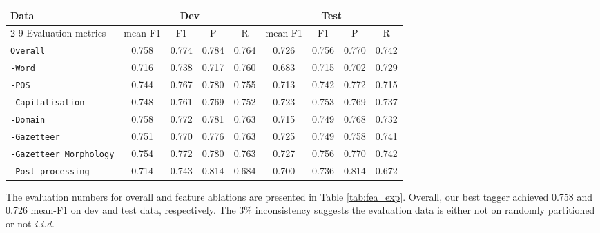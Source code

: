 \documentclass[11pt]{article}
\newcommand{\feature}[1]{\texttt{#1}\xspace}
\newcommand{\tabref}[2][]{Table#1 \ref{#2}}
\begin{document}
\begin{table*}[!htbp]
\begin{center}
\begin{tabular}{lcccccccc}
\toprule
Data                                         & \multicolumn{4}{c}{Dev}             & \multicolumn{4}{c}{Test}        \\
\cmidrule{2-9}
Evaluation metrics                           & mean-F1 & F1    & P     & R         & mean-F1 & F1    & P     & R     \\ 
\midrule
\feature{Overall}                            & 0.758   & 0.774 & 0.784 & 0.764     & 0.726   & 0.756 & 0.770 & 0.742 \\
\feature{-Word}                              & 0.716   & 0.738 & 0.717 & 0.760     & 0.683   & 0.715 & 0.702 & 0.729 \\
\feature{-POS}                               & 0.744   & 0.767 & 0.780 & 0.755     & 0.713   & 0.742 & 0.772 & 0.715 \\
\feature{-Capitalisation}                    & 0.748   & 0.761 & 0.769 & 0.752     & 0.723   & 0.753 & 0.769 & 0.737 \\
\feature{-Domain}                            & 0.758   & 0.772 & 0.781 & 0.763     & 0.715   & 0.749 & 0.768 & 0.732 \\
\feature{-Gazetteer}                         & 0.751   & 0.770 & 0.776 & 0.763     & 0.725   & 0.749 & 0.758 & 0.741 \\
\feature{-Gazetteer Morphology}              & 0.754   & 0.772 & 0.780 & 0.763     & 0.727   & 0.756 & 0.770 & 0.742 \\
\feature{-Post-processing}                   & 0.714   & 0.743 & 0.814 & 0.684     & 0.700   & 0.736 & 0.814 & 0.672 \\
\bottomrule
\end{tabular}
\end{center}
\caption{Overall experiment results and feature ablations}
\label{tab:fea_exp}
\end{table*}

The evaluation numbers for overall and feature ablations are presented in \tabref{tab:fea_exp}.
Overall, our best tagger achieved 0.758 and 0.726 mean-F1 on dev and test data, respectively.
The 3\% inconsistency suggests the evaluation data is either not on randomly partitioned or not \textit{i.i.d.}

\end{document}
